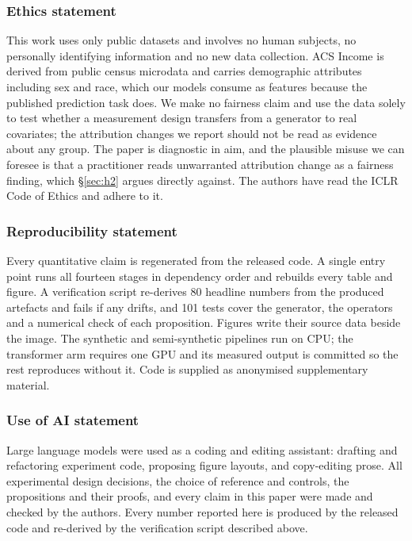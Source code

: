\documentclass{article}
\begin{document}
\subsubsection*{Ethics statement}

This work uses only public datasets and involves no human subjects, no personally identifying
information and no new data collection. ACS Income \citep{ding2021folktables} is derived from public
census microdata and carries demographic attributes including sex and race, which our models consume
as features because the published prediction task does. We make no fairness claim and use the data
solely to test whether a measurement design transfers from a generator to real covariates; the
attribution changes we report should not be read as evidence about any group. The paper is
diagnostic in aim, and the plausible misuse we can foresee is that a practitioner reads unwarranted
attribution change as a fairness finding, which \S\ref{sec:h2} argues directly against. The authors
have read the ICLR Code of Ethics and adhere to it.

\subsubsection*{Reproducibility statement}

Every quantitative claim is regenerated from the released code. A single entry point runs all
fourteen stages in dependency order and rebuilds every table and figure. A verification script
re-derives 80 headline numbers from the produced artefacts and fails if any drifts, and 101 tests
cover the generator, the operators and a numerical check of each proposition. Figures write their
source data beside the image. The synthetic and semi-synthetic pipelines run on CPU; the transformer
arm requires one GPU and its measured output is committed so the rest reproduces without it. Code is
supplied as anonymised supplementary material.

\subsubsection*{Use of AI statement}

Large language models were used as a coding and editing assistant: drafting and refactoring
experiment code, proposing figure layouts, and copy-editing prose. All experimental design decisions,
the choice of reference and controls, the propositions and their proofs, and every claim in this
paper were made and checked by the authors. Every number reported here is produced by the released
code and re-derived by the verification script described above.
\end{document}
